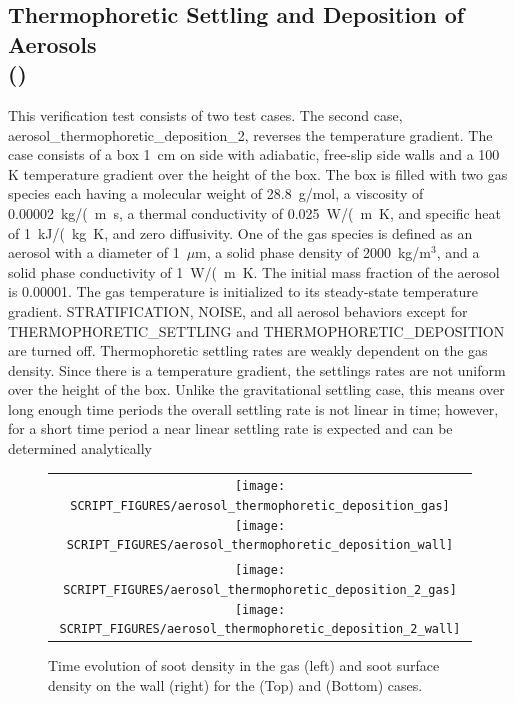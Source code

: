 \documentclass[11pt]{book}
\begin{document}
\subsection{Thermophoretic Settling and Deposition of Aerosols\\(\texorpdfstring{}{aerosol\_thermophoretic\_deposition})}
	\label{aerosol_thermophoretic_deposition}

This verification test consists of two test cases. The second case, {\ct aerosol\_thermophoretic\_deposition\_2}, reverses the temperature gradient. The case consists of a box 1~cm on side with adiabatic, free-slip side walls and a 100 K temperature gradient over the height of the box. The box is filled with two gas species each having a molecular weight of 28.8~g/mol, a viscosity of 0.00002~\si{kg/(m.s}, a thermal conductivity of 0.025~\si{W/(m.K}, and specific heat of 1~\si{kJ/(kg.K}, and zero diffusivity. One of the gas species is defined as an aerosol with a diameter of 1~$\mu$m, a solid phase density of 2000~kg/m$^3$, and a solid phase conductivity of 1~\si{W/(m.K}. The initial mass fraction of the aerosol is 0.00001. The gas temperature is initialized to its steady-state temperature gradient. {\ct STRATIFICATION}, {\ct NOISE}, and all aerosol behaviors except for {\ct THERMOPHORETIC\_SETTLING} and {\ct THERMOPHORETIC\_DEPOSITION} are turned off. Thermophoretic settling rates are weakly dependent on the gas density. Since there is a temperature gradient, the settlings rates are not uniform over the height of the box. Unlike the gravitational settling case, this means over long enough time periods the overall settling rate is not linear in time; however, for a short time period a near linear settling rate is expected and can be determined analytically

\begin{figure}[ht]
	\centering
	\begin{tabular}{c}
		\texttt{[image: SCRIPT\_FIGURES/aerosol\_thermophoretic\_deposition\_gas]}
		\texttt{[image: SCRIPT\_FIGURES/aerosol\_thermophoretic\_deposition\_wall]} \\
		\texttt{[image: SCRIPT\_FIGURES/aerosol\_thermophoretic\_deposition\_2\_gas]}
		\texttt{[image: SCRIPT\_FIGURES/aerosol\_thermophoretic\_deposition\_2\_wall]}
	\end{tabular}
	\caption[Gas phase soot densities and wall surface densities for thermophoretic deposition]{Time evolution of soot density in the gas (left) and soot surface density on the wall (right) for the  (Top) and  (Bottom) cases.}
	\label{fig:thermophoretic_deposition}
\end{figure}
\end{document}

